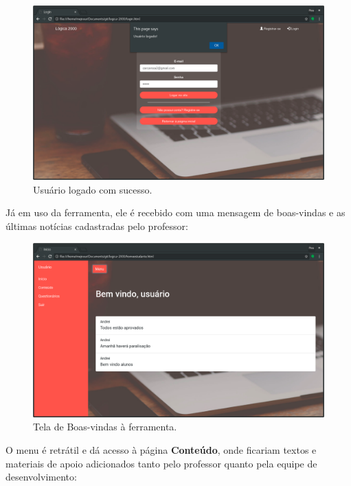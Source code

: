 \documentclass[11pt, a4paper]{article}
\begin{document}
				\begin{figure}[!h]
					\centering
					\includegraphics[scale=.32]{print5.png}
					\caption{Usuário logado com sucesso.}
				\end{figure}

			Já em uso da ferramenta, ele é recebido com uma mensagem de boas-vindas e as últimas notícias cadastradas pelo professor:

				\begin{figure}[!h]
					\centering
					\includegraphics[scale=.32]{print6.png}
					\caption{Tela de Boas-vindas à ferramenta.}
				\end{figure}

			O menu é retrátil e dá acesso à página \textbf{Conteúdo}, onde ficariam textos e materiais de apoio adicionados tanto pelo professor quanto pela equipe de desenvolvimento:
\end{document}

